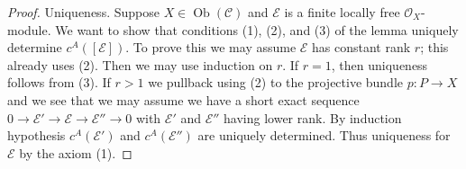 \documentclass[10pt,a4paper]{amsart}
\theoremstyle{plain}
\theoremstyle{definition}
\theoremstyle{remark}
\numberwithin{equation}{subsection}
\def\Ob{\mathop{\mathrm{Ob}}\nolimits}
\begin{document}
\begin{proof}
\medskip\noindent
Uniqueness. Suppose $X \in \Ob(\mathcal{C})$ and $\mathcal{E}$
is a finite locally free $\mathcal{O}_X$-module. We want to show
that conditions (1), (2), and (3) of the lemma uniquely determine
$c^A([\mathcal{E}])$. To prove this we may assume $\mathcal{E}$
has constant rank $r$; this already uses (2). Then we may use induction on $r$.
If $r = 1$, then uniqueness follows from (3).
If $r > 1$ we pullback using (2) to the projective bundle $p : P \to X$
and we see that we may assume we have a short exact sequence
$0 \to \mathcal{E}' \to \mathcal{E} \to \mathcal{E}'' \to 0$
with $\mathcal{E}'$ and $\mathcal{E}''$ having lower rank.
By induction hypothesis $c^A(\mathcal{E}')$ and $c^A(\mathcal{E}'')$
are uniquely determined. Thus uniqueness for $\mathcal{E}$ by
the axiom (1).
\end{proof}
\end{document}
